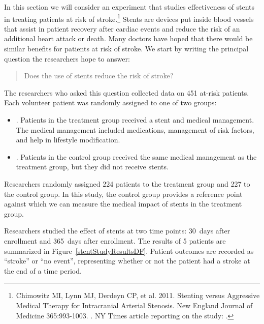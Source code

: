 In this section we will consider an experiment that studies effectiveness of stents in treating patients at risk of stroke.\footnote{Chimowitz MI, Lynn MJ, Derdeyn CP, et al. 2011. Stenting versus Aggressive Medical Therapy for Intracranial Arterial Stenosis. New England Journal of Medicine 365:993-1003. . NY Times article reporting on the study: .} Stents are devices put inside blood vessels that assist in patient recovery after cardiac events and reduce the risk of an additional heart attack or death. Many doctors have hoped that there would be similar benefits for patients at risk of stroke. We start by writing the principal question the researchers hope to answer:
\begin{quote}
Does the use of stents reduce the risk of stroke?
\end{quote}

The researchers who asked this question collected data on 451 at-risk patients. Each volunteer patient was randomly assigned to one of two groups:
\begin{itemize}
\item[]. Patients in the treatment group received a stent and medical management. The medical management included medications, management of risk factors, and help in lifestyle modification.
\item[]. Patients in the control group received the same medical management as the treatment group, but they did not receive stents.
\end{itemize}
Researchers randomly assigned 224 patients to the treatment group and 227 to the control group. In this study, the control group provides a reference point against which we can measure the medical impact of stents in the treatment group.

\D{\newpage}

Researchers studied the effect of stents at two time points: 30~days after enrollment and 365~days after enrollment. The results of 5 patients are summarized in Figure~\ref{stentStudyResultsDF}. Patient outcomes are recorded as ``stroke'' or ``no event'', representing whether or not the patient had a stroke at the end of a time period.

